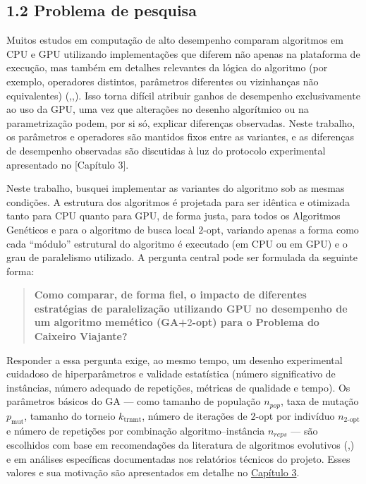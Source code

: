 \subsection{1.2 Problema de pesquisa}\label{sec-12-problema-de-pesquisa}

Muitos estudos em computação de alto desempenho comparam algoritmos em
CPU e GPU utilizando implementações que diferem não apenas na plataforma
de execução, mas também em detalhes relevantes da lógica do algoritmo
(por exemplo, operadores distintos, parâmetros diferentes ou vizinhanças
não equivalentes)
(,,).
Isso torna difícil atribuir ganhos de desempenho exclusivamente ao uso
da GPU, uma vez que alterações no desenho algorítmico ou na
parametrização podem, por si só, explicar diferenças observadas. Neste
trabalho, os parâmetros e operadores são mantidos fixos entre as
variantes, e as diferenças de desempenho observadas são discutidas à luz
do protocolo experimental apresentado no {[}Capítulo 3{]}.

Neste trabalho, busquei implementar as variantes do algoritmo sob as
mesmas condições. A estrutura dos algoritmos é projetada para ser
idêntica e otimizada tanto para CPU quanto para GPU, de forma justa,
para todos os Algoritmos Genéticos e para o algoritmo de busca local
\(2\)-opt, variando apenas a forma como cada ``módulo'' estrutural do
algoritmo é executado (em CPU ou em GPU) e o grau de paralelismo
utilizado. A pergunta central pode ser formulada da seguinte forma:

\begin{quote}
\textbf{Como comparar, de forma fiel, o impacto de diferentes
estratégias de paralelização utilizando GPU no desempenho de um
algoritmo memético (GA+\(2\)-opt) para o Problema do Caixeiro Viajante?}
\end{quote}

Responder a essa pergunta exige, ao mesmo tempo, um desenho experimental
cuidadoso de hiperparâmetros e validade estatística (número
significativo de instâncias, número adequado de repetições, métricas de
qualidade e tempo). Os parâmetros básicos do GA --- como tamanho de
população \(n_{pop}\), taxa de mutação \(p_{\text{mut}}\), tamanho do
torneio \(k_{\text{trnmt}}\), número de iterações de \(2\)-opt por
indivíduo \(n_{2\text{-opt}}\) e número de repetições por combinação
algoritmo--instância \(n_{reps}\) --- são escolhidos com base em
recomendações da literatura de algoritmos evolutivos
(,)
e em análises específicas documentadas nos relatórios técnicos do
projeto. Esses valores e sua motivação são apresentados em detalhe no
\hyperref[cap3-materiais-metodos]{Capítulo 3}.

